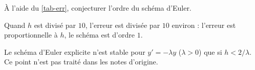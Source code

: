 \documentclass[11pt]{article}
\begin{document}
\begin{exercise}\label{exo-ordre}
 À l'aide du \cref{tab-err}, conjecturer l'ordre du schéma d'Euler. 
\end{exercise}

\begin{solution}
Quand $h$ est divisé par $10$, l'erreur est divisée par $10$ environ : l'erreur est
proportionnelle à $h$, le schéma est d'ordre $1$.
\end{solution}

\begin{added}
Le schéma d'Euler explicite n'est stable pour $y' = -\lambda y$ ($\lambda > 0$) que si
$h < 2/\lambda$. Ce point n'est pas traité dans les notes d'origine.
\end{added}
\end{document}
